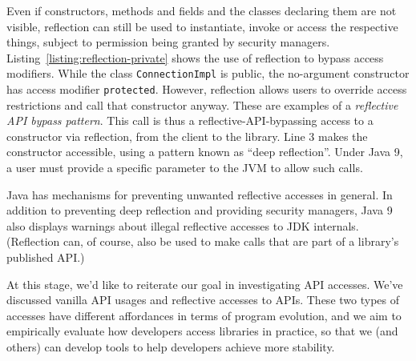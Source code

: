 Even if constructors, methods and fields and the classes declaring them are not visible, reflection can still be used to instantiate, invoke or access the respective things, subject to permission being granted by security managers. Listing~\ref{listing:reflection-private} shows the use of reflection to bypass access modifiers. While the class \texttt{ConnectionImpl} is public, the no-argument constructor has access modifier \texttt{protected}. However, reflection allows users to override access restrictions and call that constructor anyway. These are examples of a \textit{reflective API bypass pattern}. This call is thus a reflective-API-bypassing access to a constructor via reflection, from the client to the library. Line 3 makes the constructor accessible, using a pattern known as ``deep reflection''. Under Java 9, a user must provide a specific parameter to the JVM to allow such calls.

Java has mechanisms for preventing unwanted reflective accesses in general. In addition to preventing deep reflection and providing security managers, Java 9 also displays warnings about illegal reflective accesses to JDK internals. (Reflection can, of course, also be used to make calls that are part of a library's published API.)






At this stage, we'd like to reiterate our goal in investigating API accesses. We've discussed vanilla API usages and reflective accesses to APIs. These two types of accesses have different affordances in terms of program evolution, and we aim to empirically evaluate how developers access libraries in practice, so that we (and others) can develop tools to help developers achieve more stability.

